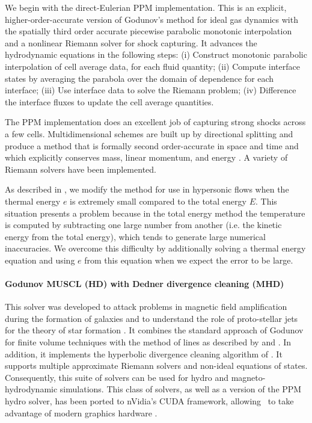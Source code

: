 We begin with the direct-Eulerian PPM implementation.  This is an
explicit, higher-order-accurate version of Godunov's method for ideal
gas dynamics with the spatially third order accurate piecewise parabolic monotonic
interpolation and a nonlinear Riemann solver for shock capturing.  It
advances the hydrodynamic equations in the following steps:
(i) Construct monotonic parabolic interpolation of cell average data,
for each fluid quantity;
(ii) Compute interface states by averaging the parabola over the
domain of dependence for each interface;
(iii) Use interface data to solve the Riemann problem;
(iv) Difference the interface fluxes to update the cell average
quantities.

The PPM implementation does an excellent job of capturing strong
shocks across a few cells.  Multidimensional schemes are built up by
directional splitting and produce a method that is formally second
order-accurate in space and time and which explicitly conserves mass,
linear momentum, and energy \citep{Hawley84, Norman86}.  A variety of
Riemann solvers have been implemented.

As described in \citet{Bryan95}, we modify the method for use in
hypersonic flows when the thermal energy $e$ is extremely small
compared to the total energy $E$.  This situation presents a problem
because in the total energy method the temperature is computed by
subtracting one large number from another (i.e. the kinetic energy
from the total energy), which tends to generate large numerical
inaccuracies. We overcome this difficulty by additionally solving a
thermal energy equation and using $e$ from this equation when we
expect the error to be large.

\paragraph{Godunov MUSCL (HD) with Dedner divergence cleaning (MHD)}
This solver was developed to attack problems in magnetic field
amplification during the formation of galaxies \citep{Wang:2009a} and
to understand the role of proto-stellar jets for the theory of star
formation \citep{Wang:2009b}. It combines the standard approach of
Godunov \citep{Godunov1959} for finite volume techniques with the
method of lines as described by \cite{leveque2002finite} and
\cite{toro-1997}. In addition, it implements the hyperbolic divergence
cleaning algorithm of \cite{2002JCoPh.175..645D}. It supports multiple
approximate Riemann solvers and non-ideal equations of
states. Consequently, this suite of solvers can be used for hydro and
magneto-hydrodynamic simulations. This class of solvers, as
well as a version of the PPM hydro solver, has been ported to
nVidia's CUDA framework, allowing \enzo\ to take advantage of modern
graphics hardware \citep{Wang:2010}.

